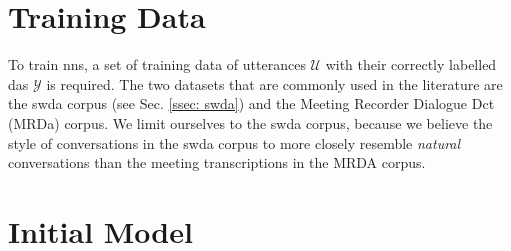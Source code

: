 

    \section{Training Data}
    To train \glspl{nn}, a set of training data of \glspl{utterance} $\mathcal{U}$ with their correctly labelled \glspl{da} $\mathcal{Y}$ is required. The two datasets that are commonly used in the literature are the \gls{swda} corpus (see Sec. \ref{ssec: swda}) and the Meeting Recorder Dialogue Dct (MRDa) corpus\cite{shriberg2004icsi}. We limit ourselves to the \gls{swda} corpus, because we believe the style of conversations in the \gls{swda} corpus to more closely resemble \textit{natural} conversations than the meeting transcriptions in the MRDA corpus.

    \section{Initial Model \label{method: kumar model}}
    
